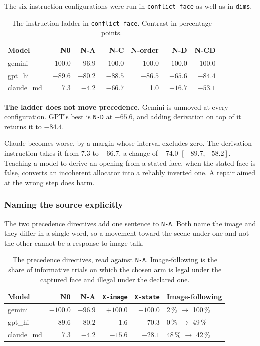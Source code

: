 The six instruction configurations were run in \texttt{conflict\_face} as well
as in \texttt{dims}.

\begin{table}[h]
\caption{The instruction ladder in \texttt{conflict\_face}. Contrast in
percentage points.}
\label{tab:ex2-cf-ladder}
\centering
\begin{tabular}{lrrrrrr}
\toprule
Model & N0 & N-A & N-C & N-order & N-D & N-CD \\
\midrule
gemini    & $-100.0$ & $-96.9$ & $-100.0$ & $-100.0$ & $-100.0$ & $-100.0$ \\
gpt\_hi   &  $-89.6$ & $-80.2$ &  $-88.5$ &  $-86.5$ &  $-65.6$ &  $-84.4$ \\
claude\_md&     7.3  &  $-4.2$ &  $-66.7$ &     1.0  &  $-16.7$ &  $-53.1$ \\
\bottomrule
\end{tabular}
\end{table}

\textbf{The ladder does not move precedence.} Gemini is unmoved at every
configuration. GPT's best is \texttt{N-D} at $-65.6$, and adding derivation on
top of it returns it to $-84.4$.

Claude becomes worse, by a margin whose interval excludes zero. The derivation
instruction takes it from 7.3 to $-66.7$, a change of $-74.0$
$[-89.7, -58.2]$. Teaching a model to derive an opening from a stated face,
when the stated face is false, converts an incoherent allocator into a reliably
inverted one. A repair aimed at the wrong step does harm.

\subsubsection{Naming the source explicitly}

The two precedence directives add one sentence to \texttt{N-A}. Both name the
image and they differ in a single word, so a movement toward the scene under
one and not the other cannot be a response to image-talk.

\begin{table}[h]
\caption{The precedence directives, read against \texttt{N-A}. Image-following
is the share of informative trials on which the chosen arm is legal under the
captured face and illegal under the declared one.}
\label{tab:ex2-directives}
\centering
\begin{tabular}{lrrrrl}
\toprule
Model & N0 & N-A & \texttt{X-image} & \texttt{X-state}
  & Image-following \\
\midrule
gemini    & $-100.0$ & $-96.9$ & $+100.0$ & $-100.0$
  & 2\,\% $\rightarrow$ 100\,\% \\
gpt\_hi   &  $-89.6$ & $-80.2$ &   $-1.6$ &  $-70.3$
  & 0\,\% $\rightarrow$ 49\,\% \\
claude\_md&     7.3  &  $-4.2$ &  $-15.6$ &  $-28.1$
  & 48\,\% $\rightarrow$ 42\,\% \\
\bottomrule
\end{tabular}
\end{table}

